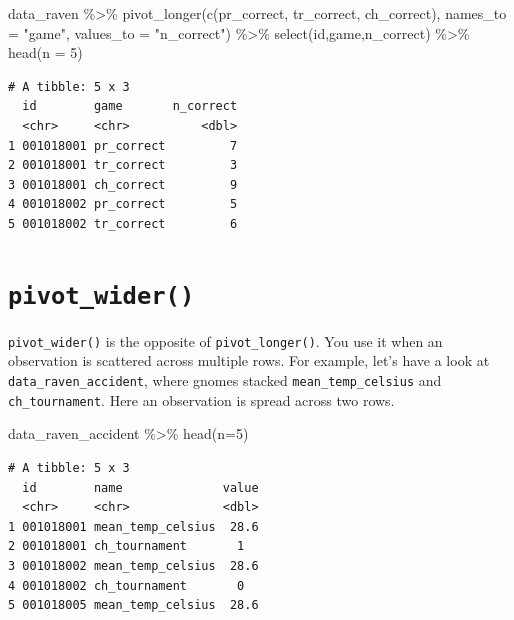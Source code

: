 \documentclass[
  letterpaper,
]{book}
\newenvironment{Shaded}{\begin{snugshade}}{\end{snugshade}}
\newcommand{\AttributeTok}[1]{\textcolor[rgb]{0.40,0.45,0.13}{#1}}
\newcommand{\DecValTok}[1]{\textcolor[rgb]{0.68,0.00,0.00}{#1}}
\newcommand{\FunctionTok}[1]{\textcolor[rgb]{0.28,0.35,0.67}{#1}}
\newcommand{\NormalTok}[1]{\textcolor[rgb]{0.00,0.23,0.31}{#1}}
\newcommand{\SpecialCharTok}[1]{\textcolor[rgb]{0.37,0.37,0.37}{#1}}
\newcommand{\StringTok}[1]{\textcolor[rgb]{0.13,0.47,0.30}{#1}}
\begin{document}
\begin{Shaded}
\begin{Highlighting}[]
\NormalTok{data\_raven }\SpecialCharTok{\%\textgreater{}\%} 
  \FunctionTok{pivot\_longer}\NormalTok{(}\FunctionTok{c}\NormalTok{(pr\_correct, tr\_correct, ch\_correct), }\AttributeTok{names\_to =} \StringTok{"game"}\NormalTok{, }\AttributeTok{values\_to =} \StringTok{"n\_correct"}\NormalTok{) }\SpecialCharTok{\%\textgreater{}\%}
  \FunctionTok{select}\NormalTok{(id,game,n\_correct) }\SpecialCharTok{\%\textgreater{}\%} 
  \FunctionTok{head}\NormalTok{(}\AttributeTok{n =} \DecValTok{5}\NormalTok{)}
\end{Highlighting}
\end{Shaded}

\begin{verbatim}
# A tibble: 5 x 3
  id        game       n_correct
  <chr>     <chr>          <dbl>
1 001018001 pr_correct         7
2 001018001 tr_correct         3
3 001018001 ch_correct         9
4 001018002 pr_correct         5
5 001018002 tr_correct         6
\end{verbatim}

\hypertarget{pivot_wider}{%
\section{\texorpdfstring{\texttt{pivot\_wider()}}{pivot\_wider()}}\label{pivot_wider}}

\texttt{pivot\_wider()} is the opposite of \texttt{pivot\_longer()}. You
use it when an observation is scattered across multiple rows. For
example, let's have a look at \texttt{data\_raven\_accident}, where
gnomes stacked \texttt{mean\_temp\_celsius} and \texttt{ch\_tournament}.
Here an observation is spread across two rows.

\begin{Shaded}
\begin{Highlighting}[]
\NormalTok{data\_raven\_accident }\SpecialCharTok{\%\textgreater{}\%} \FunctionTok{head}\NormalTok{(}\AttributeTok{n=}\DecValTok{5}\NormalTok{)}
\end{Highlighting}
\end{Shaded}

\begin{verbatim}
# A tibble: 5 x 3
  id        name              value
  <chr>     <chr>             <dbl>
1 001018001 mean_temp_celsius  28.6
2 001018001 ch_tournament       1  
3 001018002 mean_temp_celsius  28.6
4 001018002 ch_tournament       0  
5 001018005 mean_temp_celsius  28.6
\end{verbatim}
\end{document}
